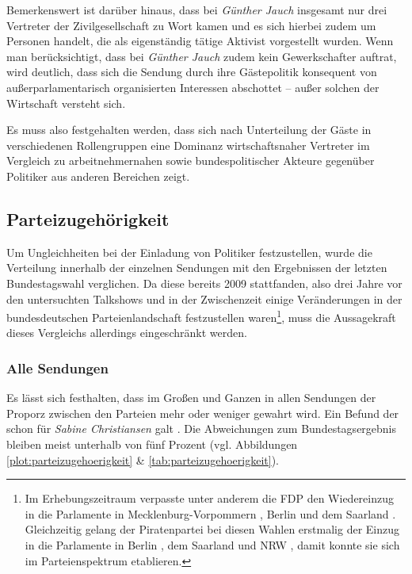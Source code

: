 Bemerkenswert ist darüber hinaus, dass bei \textit{Günther Jauch} insgesamt nur drei Vertreter der Zivilgesellschaft  zu Wort kamen und es sich hierbei zudem um Personen handelt, die als eigenständig tätige Aktivist vorgestellt wurden. Wenn man berücksichtigt, dass bei \textit{Günther Jauch} zudem kein Gewerkschafter auftrat, wird deutlich, dass sich die Sendung durch ihre Gästepolitik konsequent von außerparlamentarisch organisierten Interessen abschottet – außer solchen der Wirtschaft versteht sich.

Es muss also festgehalten werden, dass sich nach Unterteilung der Gäste in verschiedenen Rollengruppen eine Dominanz wirtschaftsnaher Vertreter im Vergleich zu arbeitnehmernahen sowie bundespolitischer Akteure gegenüber Politiker aus anderen Bereichen zeigt.

\subsection{Parteizugehörigkeit}\label{chap:parteizugehoerigkeit}

Um Ungleichheiten bei der Einladung von Politiker festzustellen, wurde die Verteilung innerhalb der einzelnen Sendungen mit den Ergebnissen der letzten Bundestagswahl verglichen. Da diese bereits 2009 stattfanden, also drei Jahre vor den untersuchten Talkshows und in der Zwischenzeit einige Veränderungen in der bundesdeutschen Parteienlandschaft festzustellen waren\footnote{Im Erhebungszeitraum verpasste unter anderem die FDP den Wiedereinzug in die Parlamente in Mecklenburg-Vorpommern \parencite{dielandeswahlleiterinEndgultigesErgebnisLandtagswahlo.J.}, Berlin \parencite{dielandeswahlleiterinZweitstimmenBeiWahlo.J.} und dem Saarland \parencite{dielandeswahlleiterinEndgultigesAmtlichesEndergebniso.J.}. Gleichzeitig gelang der Piratenpartei bei diesen Wahlen erstmalig der Einzug in die Parlamente in Berlin \parencite{dielandeswahlleiterinZweitstimmenBeiWahlo.J.}, dem Saarland \parencite{dielandeswahlleiterinEndgultigesAmtlichesEndergebniso.J.} und NRW \parencite{dielandeswahlleiterinEndgultigesErgebnisFuro.J.}, damit konnte sie sich im Parteienspektrum etablieren.}, muss die Aussagekraft dieses Vergleichs allerdings eingeschränkt werden.

\subsubsection{Alle Sendungen}

Es lässt sich festhalten, dass im Großen und Ganzen in allen Sendungen der Proporz zwischen den Parteien mehr oder weniger gewahrt wird. Ein Befund der schon für \textit{Sabine Christiansen} galt \parencite[6]{muellerSchaubuehneFuerEinflussreichen2006}. Die Abweichungen zum Bundestagsergebnis bleiben meist unterhalb von fünf Prozent (vgl. Abbildungen \vref{plot:parteizugehoerigkeit} \& \vref{tab:parteizugehoerigkeit}).

